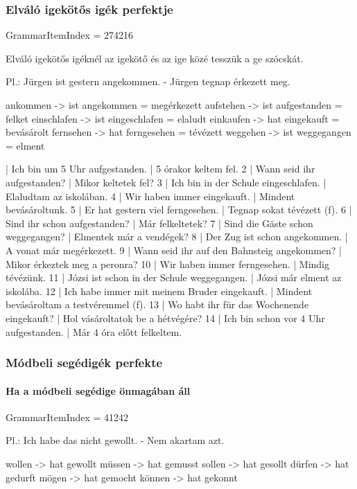 \documentclass{article}
\newenvironment{desc}{\verbatim}{\endverbatim}
\newenvironment{exmp}{\verbatim}{\endverbatim}
\begin{document}
\subsubsection{Elváló igekötős igék perfektje}

GrammarItemIndex = 274216

\begin{desc}
Elváló igekötős igéknél az igekötő és az ige közé tesszük a ge szócskát.

Pl.: Jürgen ist gestern angekommen. - Jürgen tegnap érkezett meg.

ankommen -> ist angekommen = megérkezett
aufstehen -> ist aufgestanden = felket
einschlafen -> ist eingeschlafen = elaludt
einkaufen -> hat eingekauft = bevásárolt
fernsehen -> hat ferngesehen = tévézett
weggehen -> ist weggegangen = elment
\end{desc}

\begin{exmp}
1 | Ich bin um 5 Uhr aufgestanden. | 5 órakor keltem fel.
2 | Wann seid ihr aufgestanden? | Mikor keltetek fel?
3 | Ich bin in der Schule eingeschlafen. | Elaludtam az iskolában.
4 | Wir haben immer eingekauft. | Mindent bevásároltunk.
5 | Er hat gestern viel ferngesehen. | Tegnap sokat tévézett (f).
6 | Sind ihr schon aufgestanden? | Már felkeltetek?
7 | Sind die Gäste schon weggegangen? | Elmentek már a vendégek?
8 | Der Zug ist schon angekommen. | A vonat már megérkezett.
9 | Wann seid ihr auf den Bahnsteig angekommen? | Mikor érkeztek meg a peronra?
10 | Wir haben immer ferngesehen. | Mindig tévézünk.
11 | Józsi ist schon in der Schule weggegangen. | Józsi már elment az iskolába.
12 | Ich habe immer mit meinem Bruder eingekauft. | Mindent bevásároltam a testvéremmel (f).
13 | Wo habt ihr für das Wochenende eingekauft? | Hol vásároltatok be a hétvégére?
14 | Ich bin schon vor 4 Uhr aufgestanden. | Már 4 óra előtt felkeltem.
\end{exmp}

\subsubsection{Módbeli segédigék perfekte}

\paragraph{Ha a módbeli segédige önmagában áll}

GrammarItemIndex = 41242

\begin{desc}
Pl.: Ich habe das nicht gewollt. - Nem akartam azt.

wollen -> hat gewollt
müssen -> hat gemusst
sollen -> hat gesollt
dürfen -> hat gedurft
mögen -> hat gemocht
können -> hat gekonnt
\end{desc}
\end{document}

